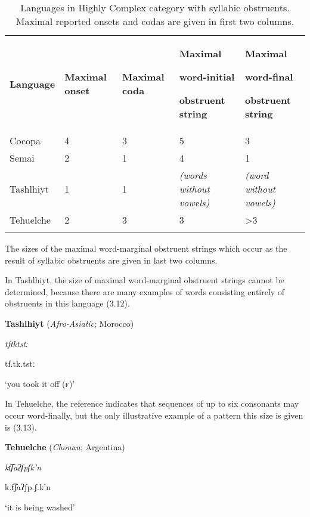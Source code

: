 \begin{table}
\begin{tabularx}{\textwidth}{XXXXX}
\lsptoprule

\textbf{Language} & \textbf{Maximal} \textbf{onset} & \textbf{Maximal} \textbf{coda} & { \textbf{Maximal} }

{ \textbf{word-initial} }

 \textbf{obstruent} \textbf{string} & { \textbf{Maximal} }

{ \textbf{word-final} }

 \textbf{obstruent} \textbf{string}\\
Cocopa & 4 & 3 & 5 & 3\\
Semai & 2 & 1 & 4 & 1\\
Tashlhiyt & 1 & 1 & \textit{(words} \textit{without} \textit{vowels)} & \textit{(word} \textit{without} \textit{vowels)}\\
Tehuelche & 2 & 3 & 3 & >3\\
\lspbottomrule
\end{tabularx}
\caption{\label{3.1}Languages in Highly Complex category with syllabic obstruents. Maximal reported onsets and codas are given in first two columns.}The sizes of the maximal word-marginal obstruent strings which occur as the result of syllabic obstruents are given in last two columns.
\end{table}

  In Tashlhiyt, the size of maximal word-marginal obstruent strings cannot be determined, because there are many examples of words consisting entirely of obstruents in this language (3.12). 

\ea\label{ex:(3.12)}
  \textbf{Tashlhiyt} (\textit{Afro-Asiatic}; Morocco)

\textit{tftktstː}

tf.tk.tstː

‘you took it off (\textsc{f})’

\citep[332]{Ridouane2008}

\z

In Tehuelche, the reference indicates that sequences of up to six consonants may occur word-finally, but the only illustrative example of a pattern this size is given is (3.13).

\ea\label{ex:(3.13)}
   \textbf{Tehuelche} (\textit{Chonan}; Argentina)

\textit{kt͡ʃaʔʃpʃk’n}

k.t͡ʃaʔʃp.ʃ.k’n

‘it is being washed’

